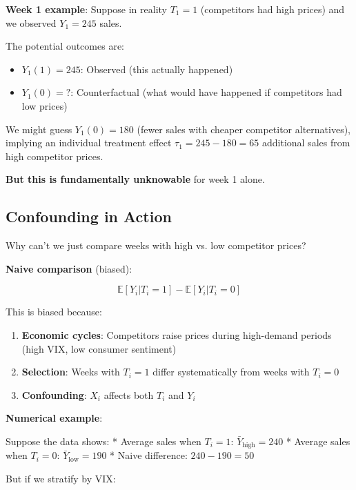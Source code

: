 \textbf{Week 1 example}: Suppose in reality $T_1 = 1$ (competitors had
high prices) and we observed $Y_1 = 245$ sales.

The potential outcomes are:
\begin{itemize}
\item $Y_1(1) = 245$: Observed (this actually happened)
\item $Y_1(0) = ?$: Counterfactual (what would have happened if competitors had low prices)
\end{itemize}

We might guess \(Y_1(0) = 180\) (fewer sales with cheaper competitor
alternatives), implying an individual treatment effect
\(\tau_1 = 245 - 180 = 65\) additional sales from high competitor
prices.

\textbf{But this is fundamentally unknowable} for week 1 alone.

\subsection{Confounding in Action}\label{_confounding_in_action}

Why can't we just compare weeks with high vs. low competitor prices?

\textbf{Naive comparison} (biased):

\[\mathbb{E}[Y_i | T_i = 1] - \mathbb{E}[Y_i | T_i = 0]\]

This is biased because:

\begin{enumerate}
\def\labelenumi{\arabic{enumi}.}
\item
  \textbf{Economic cycles}: Competitors raise prices during high-demand
  periods (high VIX, low consumer sentiment)
\item
  \textbf{Selection}: Weeks with \(T_i = 1\) differ systematically from
  weeks with \(T_i = 0\)
\item
  \textbf{Confounding}: \(X_i\) affects both \(T_i\) and \(Y_i\)
\end{enumerate}

\textbf{Numerical example}:

Suppose the data shows: * Average sales when \(T_i = 1\):
\(\bar{Y}_{\text{high}} = 240\) * Average sales when \(T_i = 0\):
\(\bar{Y}_{\text{low}} = 190\) * Naive difference: \(240 - 190 = 50\)

But if we stratify by VIX:

